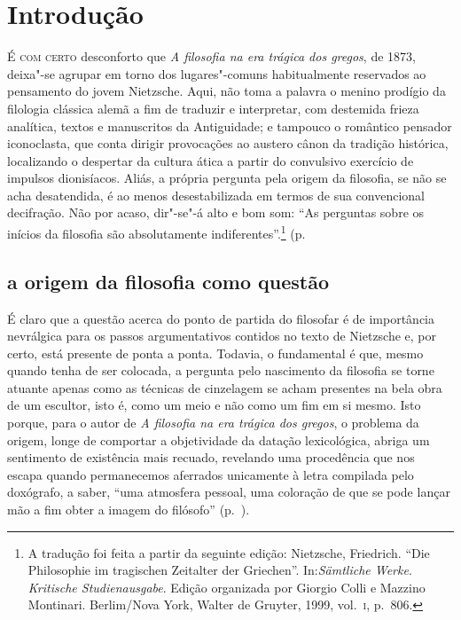 
\chapter[Introdução, por Fernando R.~de Moraes Barros]{Introdução}

\textsc{É com certo} desconforto que \textit{A filosofia na era trágica dos
 gregos}, de 1873, deixa"-se agrupar em torno dos lugares"-comuns
 habitualmente reservados ao pensamento do jovem Nietzsche. Aqui, não toma a
 palavra o menino prodígio da filologia clássica alemã a fim de traduzir e
 interpretar, com destemida frieza analítica, textos e manuscritos da
 Antiguidade; e tampouco o romântico pensador iconoclasta, que conta dirigir
 provocações ao austero cânon da tradição histórica, localizando o despertar
 da cultura ática a partir do convulsivo exercício de impulsos dionisíacos.
 Aliás, a própria pergunta pela origem da filosofia, se não se acha
 desatendida, é ao menos desestabilizada em termos de sua convencional
 decifração. Não por acaso, dir"-se"-á alto e bom som: ``As perguntas sobre
 os inícios da filosofia são absolutamente indiferentes''.\footnote {A
 tradução foi feita a partir da seguinte edição: Nietzsche, Friedrich. ``Die
 Philosophie im tragischen Zeitalter der Griechen''. In:\textit{Sämtliche Werke}. 
 \textit{Kritische Studienausgabe}. Edição organizada por Giorgio Colli e 
 Mazzino Montinari. Berlim/Nova York, Walter de Gruyter,
 1999, vol.~\textsc{i}, p.~806.} (p.~\pageref{perguntassobreosinicios)} 

\section{a origem da filosofia como questão} 

É claro que a questão acerca do ponto de partida do filosofar é de importância nevrálgica para os passos
 argumentativos contidos no texto de Nietzsche e, por certo, está presente de
 ponta a ponta. Todavia, o fundamental é que, mesmo quando tenha de ser
 colocada, a pergunta pelo nascimento da filosofia se torne atuante apenas
 como as técnicas de cinzelagem se acham presentes na bela obra de um
 escultor, isto é, como um meio e não como um fim em si mesmo. Isto porque,
 para o autor de
\textit{A filosofia na era trágica dos gregos}, o problema da origem, longe de
 comportar a objetividade da datação lexicológica, abriga um sentimento de
 existência mais recuado, revelando uma procedência que nos escapa quando
 permanecemos aferrados unicamente à letra compilada pelo doxógrafo, a saber,
 ``uma atmosfera pessoal, uma coloração de que se pode lançar mão a fim obter
 a imagem do filósofo'' (p.~\pageref{atmosferapessoal}). 

